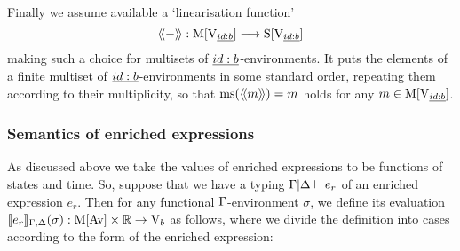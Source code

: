 Finally we assume available a `linearisation function'
%
\[\langle\!\langle - \rangle\!\rangle:\mathrm{M}[\mathrm{V}_{\underline{id:b}}] \longrightarrow \mathrm{S}[\mathrm{V}_{\underline{id:b}}] \]
%
making such a choice for multisets of $\underline{id:b}$-environments. It puts the
elements of a finite multiset of $\underline{id:b}$-environments in some standard order,
repeating them according to their multiplicity, so that
$\mathrm{ms}(\langle\!\langle m \rangle\!\rangle) = m$ holds for any $m \in \mathrm{M}[\mathrm{V}_{\underline{id:b}}]$.


\subsubsection*{Semantics of enriched expressions}
As discussed above we take the values of enriched expressions to be functions of
states and time.  So, suppose that we have a typing $\Gamma|\Delta \vdash e_r$ of an enriched
expression $e_r$. Then for any functional $\Gamma$-environment $\sigma$, we define its
evaluation
$\llbracket e_r \rrbracket_{\Gamma,\Delta}(\sigma): \mathrm{M}[\mathrm{Av}] \times \mathbb{R} \rightarrow \mathrm{V}_b$ as follows, where we
divide the definition into cases according to the form of the enriched
expression:

